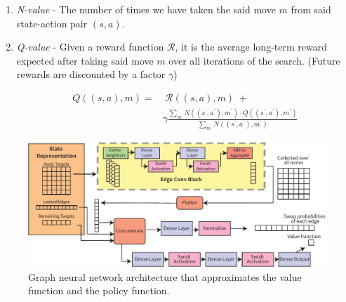 \begin{enumerate}
\item \textit{N-value} - The number of times we have taken the said move $m$ from said state-action pair $(s,a)$.
\item \textit{Q-value} - Given a reward function $\mathcal{R}$, it is the average long-term reward expected after taking said move $m$ over all iterations of the search. (Future rewards are discounted by a factor $\gamma$)

\begin{equation}
\begin{split}
    Q((s,a), m) =&\ \mathcal{R}((s,a), m)\ + \\ & \gamma \frac{\sum_{m^\prime} N((s^\prime, a^\prime), m^\prime) \cdot Q((s^\prime, a^\prime), m^\prime)}{\sum_{m^\prime} N((s^\prime, a^\prime), m^\prime)}
\end{split}
\end{equation}

\end{enumerate}

\begin{figure}[th]
\centering
    \includegraphics[width=\textwidth]{figures/qroute/Architecture.pdf}
    \caption[Graph neural network architecture that approximates value and policy function]{\label{fig:network-architecture}
     Graph neural network architecture that approximates the value function and the policy function.}
\end{figure}

